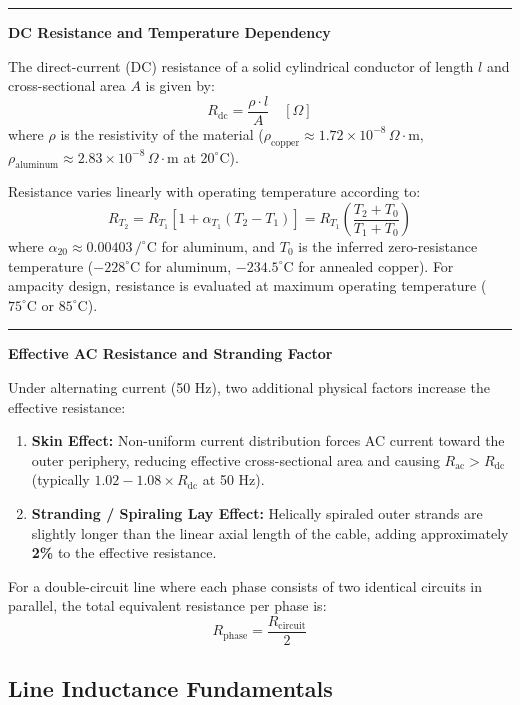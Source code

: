 \documentclass[11pt,a4paper]{article}
\newcommand{\concept}[1]{%
  \vspace{3pt}\noindent\textcolor{AnthGreen}{\rule{3.5pt}{10pt}}\enspace
  \textbf{\sffamily\color{AnthDark}#1}\par\vspace{2pt}%
}
\begin{document}
\concept{DC Resistance and Temperature Dependency}
The direct-current (DC) resistance of a solid cylindrical conductor of length $l$ and cross-sectional area $A$ is given by:
\begin{equation}
  R_{\text{dc}} = \frac{\rho \cdot l}{A} \quad [\Omega]
\end{equation}
where $\rho$ is the resistivity of the material ($\rho_{\text{copper}} \approx 1.72 \times 10^{-8}\,\Omega\cdot\text{m}$, $\rho_{\text{aluminum}} \approx 2.83 \times 10^{-8}\,\Omega\cdot\text{m}$ at $20^\circ\text{C}$).

Resistance varies linearly with operating temperature according to:
\begin{equation}
  R_{T_2} = R_{T_1} \left[ 1 + \alpha_{T_1} (T_2 - T_1) \right] = R_{T_1} \left( \frac{T_2 + T_0}{T_1 + T_0} \right)
\end{equation}
where $\alpha_{20} \approx 0.00403\,/^\circ\text{C}$ for aluminum, and $T_0$ is the inferred zero-resistance temperature ($-228^\circ\text{C}$ for aluminum, $-234.5^\circ\text{C}$ for annealed copper). For ampacity design, resistance is evaluated at maximum operating temperature ($75^\circ\text{C}$ or $85^\circ\text{C}$).

\concept{Effective AC Resistance and Stranding Factor}
Under alternating current (50 Hz), two additional physical factors increase the effective resistance:
\begin{enumerate}
  \item \textbf{Skin Effect:} Non-uniform current distribution forces AC current toward the outer periphery, reducing effective cross-sectional area and causing $R_{\text{ac}} > R_{\text{dc}}$ (typically $1.02-1.08 \times R_{\text{dc}}$ at 50 Hz).
  \item \textbf{Stranding / Spiraling Lay Effect:} Helically spiraled outer strands are slightly longer than the linear axial length of the cable, adding approximately \textbf{2\%} to the effective resistance.
\end{enumerate}
For a double-circuit line where each phase consists of two identical circuits in parallel, the total equivalent resistance per phase is:
\begin{equation}
  R_{\text{phase}} = \frac{R_{\text{circuit}}}{2}
\end{equation}

\subsection{Line Inductance Fundamentals}
\end{document}
